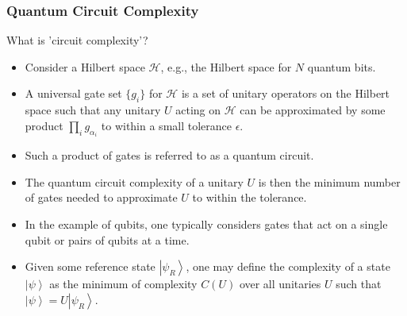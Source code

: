 \documentclass[10pt]{beamer}
\newcommand{\ket}[1]{\left| #1 \right>}
\begin{document}
\begin{frame}
\frametitle{Quantum Circuit Complexity}

What is 'circuit complexity'?

\begin{itemize}

\item Consider a Hilbert space $\mathcal{H}$, e.g., the Hilbert space for $N$ quantum bits.

\item A universal gate set $\{g_i\}$ for $\mathcal{H}$ is a set of unitary operators on the Hilbert space such that any unitary $U$ acting on $\mathcal{H}$ can be approximated by some product $\displaystyle\prod_{i} g_{\alpha_i}$ to within a small tolerance $\epsilon$. 

\item Such a product of gates is referred to as a quantum circuit.

\item The quantum circuit complexity of a unitary $U$ is then the minimum number of gates needed to approximate $U$ to within the tolerance.

\item In the example of qubits, one typically considers gates that act on a single qubit or pairs of qubits at a time.

\item Given some reference state $\ket{\psi_R}$, one may define the complexity of a state $\ket{\psi}$ as the minimum of complexity $C(U)$ over all unitaries $U$ such that $\ket{\psi} = U\ket{\psi_R}$.

\end{itemize}

\end{frame}
\end{document}
